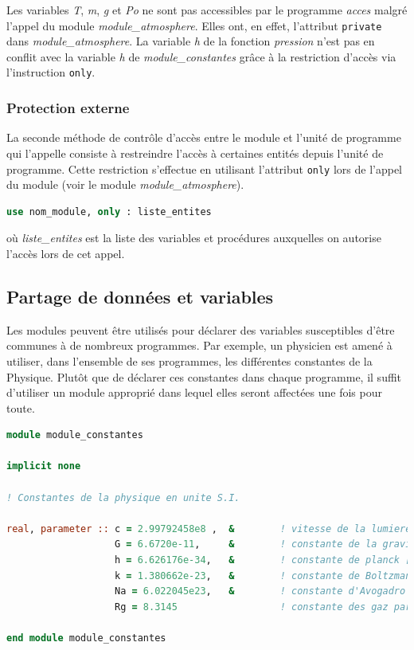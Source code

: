 \documentclass[a4paper,twoside]{article}
\begin{document}
Les variables \emph{T}, \emph{m}, \emph{g} et \emph{Po} ne sont pas accessibles par le programme \emph{acces} malgré l'appel du module \emph{module\_atmosphere}. Elles ont, en effet, l'attribut \texttt{private} dans \emph{module\_atmosphere}. La variable \emph{h} de la fonction \emph{pression} n'est pas en conflit avec la variable \emph{h} de \emph{module\_constantes} grâce à la restriction d'accès via l'instruction \texttt{only}.

\subsubsection{Protection externe}
La seconde méthode de contrôle d'accès entre le module et l'unité de programme qui l'appelle consiste à restreindre l'accès à certaines entités depuis l'unité de programme. Cette restriction s'effectue en utilisant l'attribut \texttt{only} lors de l'appel du module (voir le module \emph{module\_atmosphere}).
\begin{lstlisting}[language=Fortran]
use nom_module, only : liste_entites
\end{lstlisting}
où \emph{liste\_entites} est la liste des variables et procédures auxquelles on autorise l'accès lors de cet appel.



\subsection{Partage de données et variables}
Les modules peuvent être utilisés pour déclarer des variables susceptibles d'être communes à de nombreux programmes. Par exemple, un physicien est amené à utiliser, dans l'ensemble de ses programmes, les différentes constantes de la Physique. Plutôt que de déclarer ces constantes dans chaque programme, il suffit d'utiliser un module approprié dans lequel elles seront affectées une fois pour toute.

\begin{footnotesize}
\begin{lstlisting}[language=Fortran]
module module_constantes

implicit none

! Constantes de la physique en unite S.I.

real, parameter :: c = 2.99792458e8 ,  &        ! vitesse de la lumiere [ms-1]
                   G = 6.6720e-11,     &        ! constante de la gravitation [Nm2kg-2]
                   h = 6.626176e-34,   &        ! constante de planck [JHz-1]
                   k = 1.380662e-23,   &        ! constante de Boltzmann [JK-1]
                   Na = 6.022045e23,   &        ! constante d'Avogadro [mol-1]
                   Rg = 8.3145                  ! constante des gaz parfaits [Jmol-1K-1]
 
end module module_constantes
\end{lstlisting}
\end{footnotesize}
\end{document}
